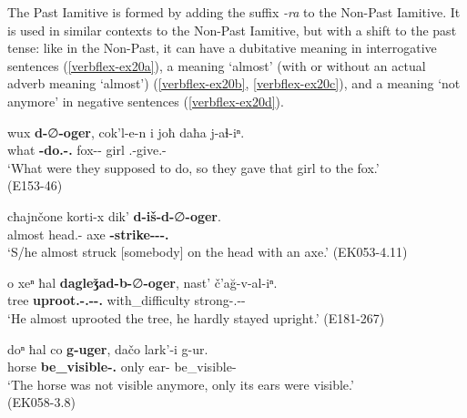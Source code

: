 The Past Iamitive is formed by adding the suffix \textit{-ra} to the Non-Past Iamitive. It is used in similar contexts to the Non-Past Iamitive, but with a shift to the past tense: like in the Non-Past, it can have a dubitative meaning in interrogative sentences (\ref{verbflex-ex20a}), a meaning `almost' (with or without an actual adverb meaning `almost') (\ref{verbflex-ex20b}, \ref{verbflex-ex20c}), and a meaning `not anymore' in negative sentences (\ref{verbflex-ex20d}).

\begin{exe}
	\ex\label{verbflex-ex20}
	\begin{xlist}
		
		
			\ex\label{verbflex-ex20a}
			\gll wux \textbf{d-}∅\textbf{-oger}, cok'l-e-n i joħ daħa j-aɬ-iⁿ. \\
			what \textbf{{\D}-do.{\Pfv}-{\Iam}.{\Pst}} fox-{\Obl}-{\Dat} {\Med} girl {\Pv} {\F}.{\Sg}-give.{\Pfv}-{\Aor} \\
			\trans `What were they supposed to do, so they gave that girl to the fox.' \\
			\hfill (E153-46)
		
		
		
			\ex\label{verbflex-ex20b}
			\gll cħajnčone korti-x dik' \textbf{d-iš-d-}∅\textbf{-oger}.\\
			almost head.{\Obl}-{\Cont} axe \textbf{{\D}-strike-{\D}-{\Tr}-{\Iam}.{\Pst}} \\
			\trans `S/he almost struck [somebody] on the head with an axe.'
			\hfill (EK053-4.11)
		
		
		
			\ex\label{verbflex-ex20c}
			\gll o xeⁿ ħal \textbf{dagleǯad-b-}∅\textbf{-oger}, nast' č'a\u{g}-v-al-iⁿ. \\
			{\Dist} tree {\Pv} \textbf{uproot.{\Pfv}-{\B}.{\Sg}-{\Tr}-{\Iam}.{\Pst}} with\_difficulty strong-{\M}.{\Sg}-{\Intr}-{\Aor} \\
			\trans `He almost uprooted the tree, he hardly stayed upright.'
			\hfill (E181-267)
		
		
		
			\ex\label{verbflex-ex20d}
			\gll doⁿ ħal co \textbf{g-uger}, dačo lark'-i g-ur. \\
			horse {\Pv} {\Neg} \textbf{be\_visible-{\Iam}.{\Pst}} only ear-{\Pl} be\_visible-{\Imprf} \\
			\trans `The horse was not visible anymore, only its ears were visible.' \\
			\hfill (EK058-3.8)
		
		
	\end{xlist}
\end{exe}

